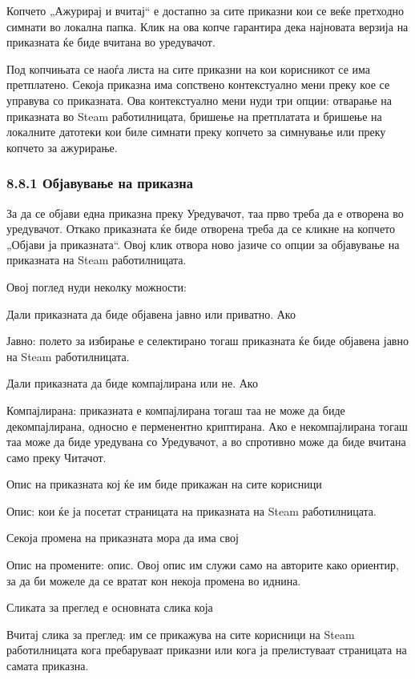 Копчето „Ажурирај и вчитај“ е достапно за сите приказни кои се веќе претходно симнати во локална папка. Клик на ова копче гарантира дека најновата верзија на приказната ќе биде вчитана во уредувачот.

Под копчињата се наоѓа листа на сите приказни на кои корисникот се има претплатено. Секоја приказна има сопствено контекстуално мени преку кое се управува со приказната. Ова контекстуално мени нуди три опции: отварање на приказната во Steam работилницата, бришење на претплатата и бришење на локалните датотеки кои биле симнати преку копчето за симнување или преку копчето за ажурирање.

\subsubsection{8.8.1 Објавување на приказна}

За да се објави една приказна преку Уредувачот, таа прво треба да е отворена во уредувачот. Откако приказната ќе биде отворена треба да се кликне на копчето „Објави ја приказната“. Овој клик отвора ново јазиче со опции за објавување на приказната на Steam работилницата.

Овој поглед нуди неколку можности:

Дали приказната да биде објавена јавно или приватно. Ако

Јавно: полето за избирање е селектирано тогаш приказната ќе биде објавена јавно на Steam работилницата.

Дали приказната да биде компајлирана или не. Ако

Компајлирана: приказната е компајлирана тогаш таа не може да биде декомпајлирана, односно е перменентно криптирана. Ако е некомпајлирана тогаш таа може да биде уредувана со Уредувачот, а во спротивно може да биде вчитана само преку Читачот.

Опис на приказната кој ќе им биде прикажан на сите корисници

Опис: кои ќе ја посетат страницата на приказната на Steam работилницата.


Секоја промена на приказната мора да има свој

Опис на промените: опис. Овој опис им служи само на авторите како ориентир, за да би можеле да се вратат кон некоја промена во иднина.

Сликата за преглед е основната слика која

Вчитај слика за преглед: им се прикажува на сите корисници на Steam работилницата кога пребаруваат приказни или кога ја прелистуваат страницата на самата приказна.

